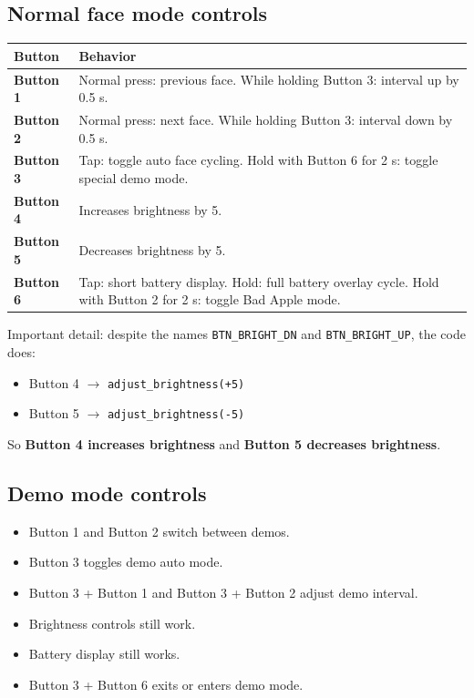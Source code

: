 \documentclass[11pt]{article}
\begin{document}
\subsection{Normal face mode controls}
\begin{longtable}{>{\bfseries}p{}p{}}
\toprule
Button & Behavior \\
\midrule
Button 1 & Normal press: previous face. While holding Button 3: interval up by 0.5 s. \\
Button 2 & Normal press: next face. While holding Button 3: interval down by 0.5 s. \\
Button 3 & Tap: toggle auto face cycling. Hold with Button 6 for 2 s: toggle special demo mode. \\
Button 4 & Increases brightness by 5. \\
Button 5 & Decreases brightness by 5. \\
Button 6 & Tap: short battery display. Hold: full battery overlay cycle. Hold with Button 2 for 2 s: toggle Bad Apple mode. \\
\bottomrule
\end{longtable}

Important detail: despite the names \texttt{BTN\_BRIGHT\_DN} and \texttt{BTN\_BRIGHT\_UP}, the code does:
\begin{itemize}
  \item Button 4 $\rightarrow$ \texttt{adjust\_brightness(+5)}
  \item Button 5 $\rightarrow$ \texttt{adjust\_brightness(-5)}
\end{itemize}
So \textbf{Button 4 increases brightness} and \textbf{Button 5 decreases brightness}.

\subsection{Demo mode controls}
\begin{itemize}
  \item Button 1 and Button 2 switch between demos.
  \item Button 3 toggles demo auto mode.
  \item Button 3 + Button 1 and Button 3 + Button 2 adjust demo interval.
  \item Brightness controls still work.
  \item Battery display still works.
  \item Button 3 + Button 6 exits or enters demo mode.
\end{itemize}
\end{document}
